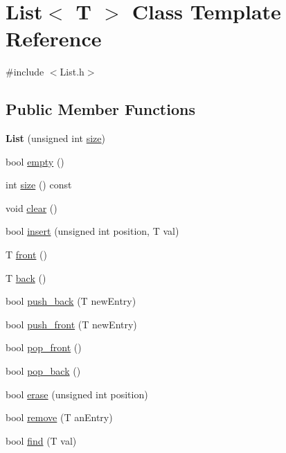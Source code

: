 \hypertarget{class_list}{}\section{List$<$ T $>$ Class Template Reference}
\label{class_list}


{\ttfamily \#include $<$List.\+h$>$}

\subsection*{Public Member Functions}
\begin{DoxyCompactItemize}
\item 
\mbox{\label{class_list_a210dcb839a4a5da20c98d0cd48e526f8}} 
{\bfseries List} (unsigned int \hyperlink{class_list_aec8852ab225094e14ad424e8d71a4dac}{size})
\item 
bool \hyperlink{class_list_a3737ca60365287ce663393d8c07d1a41}{empty} ()
\item 
int \hyperlink{class_list_aec8852ab225094e14ad424e8d71a4dac}{size} () const
\item 
void \hyperlink{class_list_ae296516a252e11963dbf963727ce429a}{clear} ()
\item 
bool \hyperlink{class_list_a9c20ddd34151f1fdf67549f3c94364da}{insert} (unsigned int position, T val)
\item 
T \hyperlink{class_list_a2606aeb0b00885fd7b3037a29ae28c8b}{front} ()
\item 
T \hyperlink{class_list_adcdd54cf42f6a98990618901e1fafa59}{back} ()
\item 
bool \hyperlink{class_list_adef1cfd54ad3f25eb27acde794e7f279}{push\+\_\+back} (T new\+Entry)
\item 
bool \hyperlink{class_list_a7ad16a889175f6bbb32aeb295c8f30c3}{push\+\_\+front} (T new\+Entry)
\item 
bool \hyperlink{class_list_a60579fbdaaceccb61aa5d8e33224e045}{pop\+\_\+front} ()
\item 
bool \hyperlink{class_list_aa6ff98e23b4ceea509e3a29fa5ceecd7}{pop\+\_\+back} ()
\item 
bool \hyperlink{class_list_a0af93f391664cbd3476b1a0fe0d3619e}{erase} (unsigned int position)
\item 
bool \hyperlink{class_list_a91f71c17d25baa99323e99297695492f}{remove} (T an\+Entry)
\item 
bool \hyperlink{class_list_a0b06dd3bed0aea651c190bf14ce76501}{find} (T val)

\end{DoxyCompactItemize}
